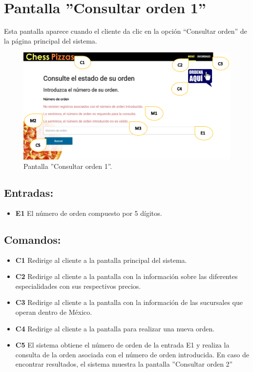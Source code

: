 \documentclass[oneside,10pt]{book}
\title{}
\subtitle{}
\author{}
\begin{document}
\section{Pantalla ''Consultar orden 1''}

Esta pantalla aparece cuando el cliente da clic en la opción “Consultar orden” de la página principal del sistema.

\begin{figure}[htbp!]
		\centering
			\includegraphics[width=1.1\textwidth]{images/1}
		\caption{Pantalla ''Consultar orden 1''.}
	\end{figure}
	
\subsection{Entradas:}
\begin{itemize}
\item \textbf{E1} El número de orden compuesto por 5 dígitos.
\end{itemize}

\subsection{Comandos:}
\begin{itemize}
\item \textbf{C1} Redirige al cliente a la pantalla principal del sistema.
\item \textbf{C2} Redirige al cliente a la pantalla con la información sobre las diferentes especialidades con sus respectivos precios.
\item \textbf{C3} Redirige al cliente a la pantalla con la información de las sucursales que operan dentro de México.
\item \textbf{C4} Redirige al cliente a la pantalla para realizar una nueva orden.
\item \textbf{C5} El sistema obtiene el número de orden de la entrada E1 y realiza la consulta de la orden asociada con el número de orden introducida. En caso de encontrar resultados, el sistema muestra la pantalla ''Consultar orden 2''
\end{itemize}
\end{document}
